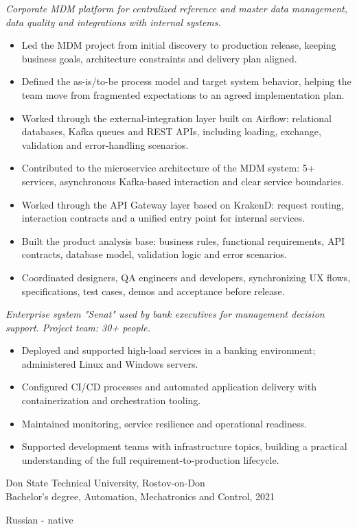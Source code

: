 \textit{Corporate MDM platform for centralized reference and master data management, data quality and integrations with internal systems.}
\begin{itemize}[leftmargin=1.3em, itemsep=0.2em]
  \item Led the MDM project from initial discovery to production release, keeping business goals, architecture constraints and delivery plan aligned.
  \item Defined the as-is/to-be process model and target system behavior, helping the team move from fragmented expectations to an agreed implementation plan.
  \item Worked through the external-integration layer built on Airflow: relational databases, Kafka queues and REST APIs, including loading, exchange, validation and error-handling scenarios.
  \item Contributed to the microservice architecture of the MDM system: 5+ services, asynchronous Kafka-based interaction and clear service boundaries.
  \item Worked through the API Gateway layer based on KrakenD: request routing, interaction contracts and a unified entry point for internal services.
  \item Built the product analysis base: business rules, functional requirements, API contracts, database model, validation logic and error scenarios.
  \item Coordinated designers, QA engineers and developers, synchronizing UX flows, specifications, test cases, demos and acceptance before release.
\end{itemize}

\textit{Enterprise system "Senat" used by bank executives for management decision support. Project team: 30+ people.}
\begin{itemize}[leftmargin=1.3em, itemsep=0.2em]
  \item Deployed and supported high-load services in a banking environment; administered Linux and Windows servers.
  \item Configured CI/CD processes and automated application delivery with containerization and orchestration tooling.
  \item Maintained monitoring, service resilience and operational readiness.
  \item Supported development teams with infrastructure topics, building a practical understanding of the full requirement-to-production lifecycle.
\end{itemize}

Don State Technical University, Rostov-on-Don\\
Bachelor's degree, Automation, Mechatronics and Control, 2021

Russian - native
